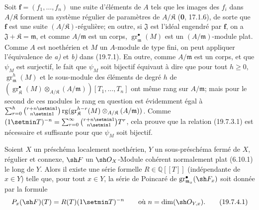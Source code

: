 Soit $\mathbf f=(f_1,\ldots,f_n)$ une suite d'éléments de $A$ tels que les images des $f_i$ dans $A/\mathfrak K$ forment un système régulier de paramètres de $A/\mathfrak K$ (\textbf{0}, 17.1.6), de sorte que $\mathbf f$ est une suite $(A/\mathfrak K)$-régulière; en outre, si $\mathfrak J$ est l'idéal engendré par $\mathbf f$, on a $\mathfrak J+\mathfrak K=\mathfrak m$, et comme $A/\mathfrak m$ est un corps, $\operatorname{gr}_{\mathfrak m}^\bullet(M)$ est un $(A/\mathfrak m)$-module plat. Comme $A$ est noethérien et $M$ un $A$-module de type fini, on peut appliquer l'équivalence de \emph{a)} et \emph{b)} dans (19.7.1). En outre, comme $A/\mathfrak m$ est un corps, et que $\psi_M$ est surjectif, le fait que $\psi_M$ soit bijectif équivaut à dire que pour tout $h\geq0$, $\operatorname{gr}_{\mathfrak m}^h(M)$ et le sous-module des éléments de degré $h$ de $(\operatorname{gr}_{\mathfrak K}^\bullet(M)\otimes_{A/\mathfrak K}(A/\mathfrak m))[T_1,\ldots,T_n]$ ont même rang sur $A/\mathfrak m$; mais pour le second de ces modules le rang en question est évidemment égal à $\sum_{r=0}^h\binom{r+n\setmin 1}{n\setmin 1}\operatorname{rg}(\operatorname{gr}_{\mathfrak K}^{h-r}(M)\otimes_{A/\mathfrak K}(A/\mathfrak m))$. Comme $(1\setmin T)^{-n}=\sum_{r=0}^{\infty}\binom{r+n\setmin 1}{n\setmin 1}T^r$, cela prouve que la relation (19.7.3.1) est nécessaire et suffisante pour que $\psi_M$ soit bijectif.

\begin{corollary}[19.7.4]
\label{IV.19.7.4}
Soient $X$ un préschéma localement noethérien, $Y$ un sous-préschéma fermé de $X$, régulier et connexe, $\sh F$ un $\sh O_X$-Module cohérent normalement plat \textup{(6.10.1)} le long de $Y$. Alors il existe une série formelle $R\in\mathbb{Q}[[T]]$ \textup{(indépendante de $x\in Y$)} telle que, pour tout $x\in Y$, la série de Poincaré de $\operatorname{gr}_{\mathfrak m_x}^\bullet(\sh F_x)$ soit donnée par la formule
\begin{equation}
  P_x(\sh F)(T)=R(T)(1\setmin T)^{-n}\qquad\text{où }n=\dim(\sh O_{Y,x}).
  \tag{19.7.4.1}\label{IV.19.7.4.1}
\end{equation}
\end{corollary}

